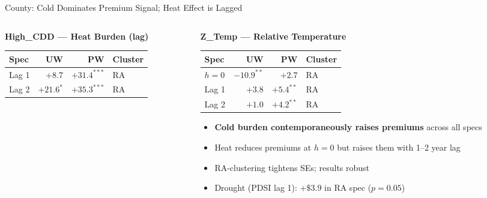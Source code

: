 \documentclass[aspectratio=169,11pt]{beamer}
\newcommand{\emphcolor}[1]{{\color{WarmOrange}\textbf{#1}}}
\newcommand{\tealtext}[1]{{\color{Teal}#1}}
\begin{document}
\begin{frame}{County: Cold Dominates Premium Signal; Heat Effect is Lagged}
\begin{columns}[T]
\begin{column}{0.47\textwidth}
      \tealtext{\textbf{High\_CDD — Heat Burden (lag)}}\\[0.25em]
      \begin{tabular}{lrrl}
        \toprule
        Spec & UW & PW & Cluster \\
        \midrule
        Lag 1 & $+8.7$ & \emphcolor{$+31.4^{***}$} & RA \\
        Lag 2 & \emphcolor{$+21.6^{*}$} & \emphcolor{$+35.3^{***}$} & RA \\
        \bottomrule
      \end{tabular}
    \end{column}
    \begin{column}{0.47\textwidth}
      \tealtext{\textbf{Z\_Temp — Relative Temperature}}\\[0.25em]
      \begin{tabular}{lrrl}
        \toprule
        Spec & UW & PW & Cluster \\
        \midrule
        $h{=}0$ & \emphcolor{$-10.9^{**}$} & $+2.7$ & RA \\
        Lag 1   & $+3.8$ & \emphcolor{$+5.4^{**}$} & RA \\
        Lag 2   & $+1.0$ & \emphcolor{$+4.2^{**}$} & RA \\
        \bottomrule
      \end{tabular}
      \vspace{0.5em}
      \begin{itemize}\itemsep0.3em
        \item \emphcolor{Cold burden contemporaneously raises premiums} across all specs
        \item Heat reduces premiums at $h{=}0$ but raises them with 1--2 year lag
        \item RA-clustering tightens SEs; results robust
        \item Drought (PDSI lag 1): $+\$3.9$ in RA spec ($p{=}0.05$)
      \end{itemize}
    \end{column}
  \end{columns}
\end{frame}
\end{document}
